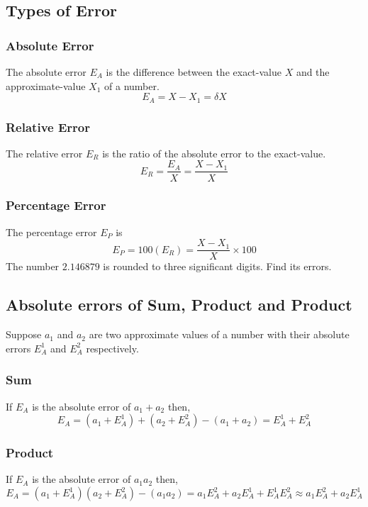 \documentclass[aima203_lecturenotes_ku.tex]{subfiles}
\begin{document}
\subsection{Types of Error}
\subsubsection{Absolute Error}
The absolute error \(E_A\) is the difference between the exact-value \(X\) and the approximate-value \(X_1\) of a number.
\begin{equation}
  \label{eq:1}
  E_A = X-X_1 = \delta X
\end{equation}

\subsubsection{Relative Error}
The relative error \(E_R\) is the ratio of the absolute error to the exact-value.
\begin{equation}
  \label{eq:2}
  E_R = \frac{E_A}{X} = \frac{X-X_1}{X}
\end{equation}

\subsubsection{Percentage Error}
The percentage error \(E_P\) is
\begin{equation}
  \label{eq:3}
  E_P = 100(E_R) = \frac{X-X_1}{X} \times 100
\end{equation}
The number $2.146879$ is rounded to three significant digits. Find its errors.

\subsection{Absolute errors of Sum, Product and Product}
Suppose \(a_1\) and \(a_2\) are two approximate values of a number with their absolute errors \(E_A^1\) and \(E_A^2\) respectively.

\subsubsection{Sum}
If \(E_A\) is the absolute error of \(a_1 + a_2\) then,
\begin{equation}
  \label{eq:4}
  E_A = (a_1 + E_A^1) + (a_2 +E_A^2) -(a_1+a_2) = E_A^1 +E_A^2
\end{equation}

\subsubsection{Product}
If \(E_A\) is the absolute error of \(a_1 a_2\) then,
\begin{equation}
  \label{eq:5}
  E_A = (a_1 + E_A^1) (a_2 +E_A^2) -(a_1a_2) = a_1E_A^2 +a_2E_A^1+E_A^1E_A^2 \approx a_1E_A^2 +a_2E_A^1
\end{equation}
\end{document}
